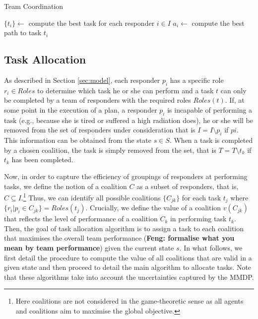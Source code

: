 \begin{algorithm}[t]
  \caption{Team Coordination}\small
  $\{ t_i \} \gets$ compute the best task for each responder $i\in I$ \;
   {
    $a_i \gets$ compute the best path to task $t_i$ \;
  }
  \label{alg:coordination}
\end{algorithm}

\subsection{Task Allocation}
\label{sec:taskplanning}

\noindent As described in Section \ref{sec:model}, each responder $p_i$ has a
specific role $r_i \in Roles$ to determine which task he or she can perform and  a task $t$ 
can only be completed by a team of responders with the required
roles $Roles(t)$. If, at some point in the execution of a plan, a responder $p_i$ is incapable of performing a
task (e.g., because she is tired or suffered a high radiation does), he or she will be removed from the set of responders under consideration that is $I = I \setminus p_i$ if $pi$. This information can be obtained from the state $s \in S$.  When a task is completed by a chosen coalition, the task is simply removed from the set, that is $T = T\setminus t_k$ if $t_k$ has been completed. 

Now, in order to capture the efficiency of groupings of responders at performing tasks, we define the notion of a coalition $C$ as a subset of responders, that is, $C \subseteq I$.\footnote{Here coalitions are not considered in the game-theoretic sense as all agents and coalitions aim to maximise the global objective.} Thus, we can identify all possible coalitions $\{ C_{jk} \}$ for each task $t_j$ where $\{r_i | p_i \in C_{jk}\} = Roles(t_j)$. Crucially, we define the value of a coalition $v(C_{jk})$ that reflects the level of performance of a coalition $C_k$ in performing task $t_k$.  Then, the goal of task allocation algorithm is to assign a task to each
coalition that maximises the overall team performance (\textbf{Feng: formalise what you mean by team performance}) given the current
state $s$. In what follows, we first detail the procedure to compute the value of all coalitions that are valid in a given state and then proceed to detail the main algorithm to allocate tasks. Note that these algorithms take into account the uncertainties captured by the MMDP.


